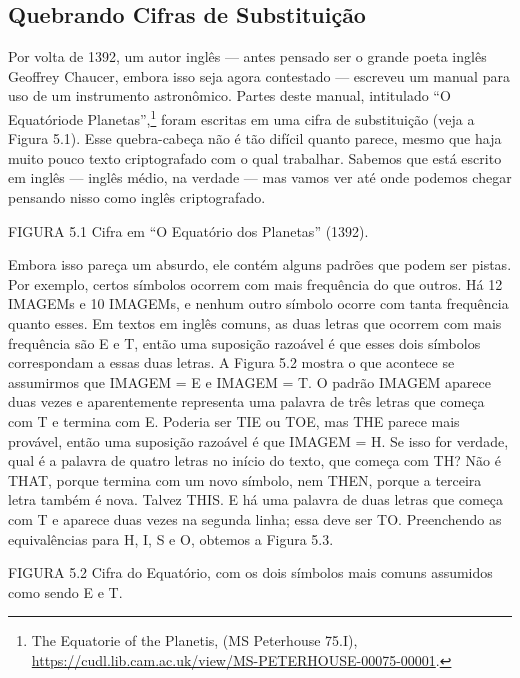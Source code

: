 \documentclass{book}
\begin{document}

\subsection{Quebrando Cifras de Substituição}
\label{segredos:cifras}

Por volta de 1392, um autor inglês --- antes pensado ser o grande poeta inglês Geoffrey Chaucer, embora isso seja agora contestado --- escreveu um manual para uso de um instrumento astronômico. Partes deste manual, intitulado ``O Equatóriode Planetas'',\footnote{The Equatorie of the Planetis, (MS Peterhouse 75.I), \url{https://cudl.lib.cam.ac.uk/view/MS-PETERHOUSE-00075-00001}.} foram escritas em uma cifra de substituição (veja a Figura 5.1). Esse quebra-cabeça não é tão difícil quanto parece, mesmo que haja muito pouco texto criptografado com o qual trabalhar. Sabemos que está escrito em inglês --- inglês médio, na verdade --- mas vamos ver até onde podemos chegar pensando nisso como inglês criptografado.

FIGURA 5.1 Cifra em ``O Equatório dos Planetas'' (1392).

Embora isso pareça um absurdo, ele contém alguns padrões que podem ser pistas. Por exemplo, certos símbolos ocorrem com mais frequência do que outros. Há 12 IMAGEMs e 10 IMAGEMs, e nenhum outro símbolo ocorre com tanta frequência quanto esses. Em textos em inglês comuns, as duas letras que ocorrem com mais frequência são E e T, então uma suposição razoável é que esses dois símbolos correspondam a essas duas letras. A Figura 5.2 mostra o que acontece se assumirmos que IMAGEM = E e IMAGEM = T. O padrão IMAGEM aparece duas vezes e aparentemente representa uma palavra de três letras que começa com T e termina com E. Poderia ser TIE ou TOE, mas THE parece mais provável, então uma suposição razoável é que IMAGEM = H. Se isso for verdade, qual é a palavra de quatro letras no início do texto, que começa com TH? Não é THAT, porque termina com um novo símbolo, nem THEN, porque a terceira letra também é nova. Talvez THIS. E há uma palavra de duas letras que começa com T e aparece duas vezes na segunda linha; essa deve ser TO. Preenchendo as equivalências para H, I, S e O, obtemos a Figura 5.3.

FIGURA 5.2 Cifra do Equatório, com os dois símbolos mais comuns assumidos como sendo E e T.
\end{document}
